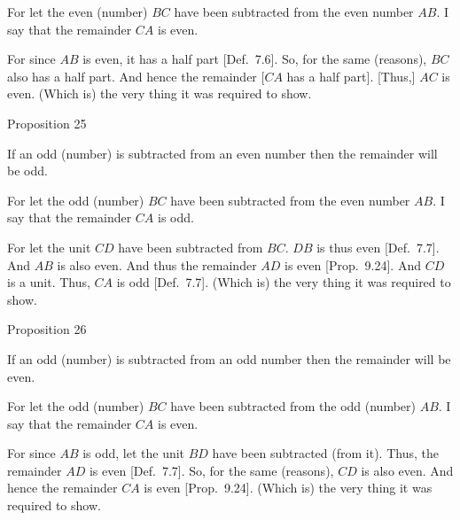 \epsfysize=0.3in
\centerline{}

For let the even (number) $BC$ have been subtracted from the even number
$AB$. I say that the remainder $CA$ is even.

For since $AB$ is even, it has a half part [Def.~7.6]. 
So, for the same (reasons), $BC$ also has a half part. And hence the remainder [$CA$ has a half part]. [Thus,] $AC$ is even. (Which is) the very thing it was required to show.~\\


\begin{center}
{\large Proposition 25}
\end{center}

If an odd (number) is subtracted from an even
number then the remainder will be odd.

\epsfysize=0.3in
\centerline{}

For let the odd (number) $BC$ have been subtracted from the even number
$AB$. I say that the remainder $CA$ is odd.

For let the unit $CD$ have been subtracted from $BC$. $DB$ is thus even
[Def.~7.7]. And $AB$ is also even. And thus the remainder $AD$ is even [Prop.~9.24]. And $CD$ is a unit. 
Thus, $CA$ is odd [Def.~7.7]. (Which is) the very thing it was required to show.


\begin{center}
{\large Proposition 26}
\end{center}

If an odd (number) is subtracted from an odd
number then the remainder will be even.

\epsfysize=0.3in
\centerline{}

For let the odd (number) $BC$ have been subtracted from the odd
(number) $AB$. I say that the remainder $CA$ is even.

For since $AB$ is odd, let the unit $BD$ have been subtracted (from it). 
Thus, the remainder $AD$ is even [Def.~7.7]. So, for the same (reasons), 
$CD$ is also even. And hence the remainder $CA$ is even [Prop.~9.24]. (Which is) the very thing it was required to show.


